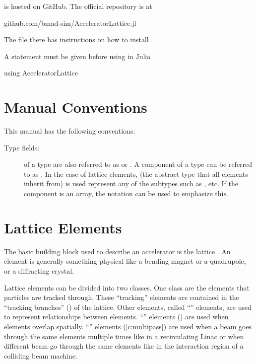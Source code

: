 \accellat is hosted on GitHub. The official repository is at
\begin{example}
  github.com/bmad-sim/AcceleratorLattice.jl
\end{example}
The  file there has instructions on how to install \accellat.

A  statement must be given before using \accellat in Julia
\begin{example}
  using AcceleratorLattice
\end{example}

\section{Manual Conventions}
\label{s:manual.con}

This manual has the following conventions:
\begin{description}
%
\item[Type fields:]
 of a type are also referred to as  or .
A component  of a type  can be referred to as . In the case
of lattice elements,  (the abstract type that all elements inherit from) is
used represent any of the subtypes such as , etc. If the component
is an array, the notation  can be used to emphasize this.
%
\end{description}

\section{Lattice Elements}
\label{s:element.def}

The basic building block used to describe an accelerator is the lattice . An
element is generally something physical like a bending magnet or a
quadrupole, or a diffracting crystal. 

Lattice elements can be divided into two classes.
One class are the elements that particles are tracked through. These ``tracking'' elements are
contained in the ``tracking branches'' () of the lattice. Other elements, 
called ``'' elements, are used to
represent relationships between elements. ``'' elements () are
used when elements overlap spatially. ``'' elements (\ref{c:multipass})
are used when a beam goes through the same elements multiple times like in a recirculating Linac
or when different beam go through the same elements like in the interaction region of a
colliding beam machine.

